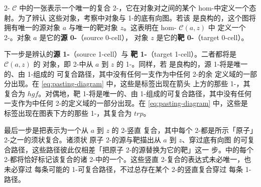 \begin{digression}\label{dig:how-to-read-a-pasting-diagram}
2-\trCategory{} $\mathcal{C}$ 中的一张\trPastingDiagram{}表示一个唯一的复合
2-\trCell，它在对象对之间的某个 hom-\trCategory{}中定义一个态射。为了辨认
这些对象，考察\trPastingDiagram{}中对象与 1-\trCell{}的底有向图。若该%
\trPastingDiagram{}是良构的，这个图将拥有唯一的源对象 $a$ 与唯一的靶对象
$z$。这表明\trPastingDiagram{}在 hom-\trCategory{} $\mathcal{C}(a,z)$ 中
定义一个 2-\trCell。对象 $a$ 是它的\textbf{源 0-\trCell}（source 0-cell），
对象 $z$ 是它的\textbf{靶 0-\trCell}（target 0-cell）。

下一步是辨认\trPastingDiagram{}的\textbf{源 1-\trCell}（source 1-cell）与
\textbf{靶 1-\trCell}（target 1-cell）。二者都将是 $\mathcal{C}(a,z)$ 的
对象，即 2-\trCategory{}中从 $a$ 到 $z$ 的 1-\trCell。同样，若%
\trPastingDiagram{}是良构的，源 1-\trCell{}将是唯一的、由 1-\trCell{}组成的
可复合路径，其中没有任何一支作为\trPastingDiagram{}中任何 2-\trCell{}的余
定义域的一部分出现。在 \eqref{eq:pasting-diagram} 中，这些是标签出现在箭头
上方的那些 1-\trCell，其复合为 $hgf$。对偶地，靶 1-\trCell{}将是唯一的、由
1-\trCell{}组成的可复合路径，其中没有任何一支作为\trPastingDiagram{}中任何
2-\trCell{}的定义域的一部分出现。在 \eqref{eq:pasting-diagram} 中，这些是
标签出现在图表下方的那些 1-\trCell，其复合为 $trp$。

最后一步是把\trPastingDiagram{}表示为一个从 $a$ 到 $z$ 的 2-\trCell{}竖直
复合，其中每个 2-\trCell{}都是所示「原子」2-\trCell{}之一的须状复合。诸须状
原子 2-\trCell{}的源与靶描出从 $a$ 到 $z$、穿过\trPastingDiagram{}底有向图
的可复合路径，这些路径彼此仅相差「把原子 2-\trCell{}的源替换为它的靶」这一
步。\trPastingDiagram{}中的每个 2-\trCell{}都将恰好标记该复合的诸
2-\trCell{}中的一个。这些竖直 2-\trCell{}复合的表达式未必唯一，也未必穿过
每条可能的 1-\trCell{}可复合路径，不过总存在某个 2-\trCell{}的竖直复合穿过
每条 1-\trCell{}路径。


\end{digression}
